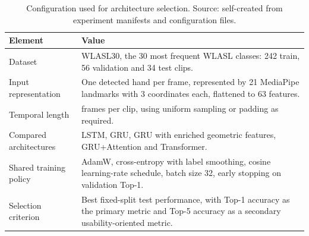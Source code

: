 \begin{table}[H]
    \centering
    \small
    \renewcommand{\arraystretch}{1.25}
    \caption{Configuration used for architecture selection. Source: self-created from experiment manifests and configuration files.}
    \label{tab:exp_phase2_config}
    \begin{tabularx}{\linewidth}{@{}>{\RaggedRight\arraybackslash}p{3.2cm} >{\RaggedRight\arraybackslash}X@{}}
        \toprule
        \textbf{Element}       & \textbf{Value}                                                                                                                            \\
        \midrule
        Dataset                & WLASL30, the 30 most frequent WLASL classes: 242 train, 56 validation and 34 test clips.                                                  \\
        Input representation   & One detected hand per frame, represented by 21 MediaPipe landmarks with 3 coordinates each, flattened to 63 features.                     \\
        Temporal length        & 64 frames per clip, using uniform sampling or padding as required.                                                                        \\
        Compared architectures & LSTM, GRU, GRU with enriched geometric features, GRU+Attention and Transformer.                                                           \\
        Shared training policy & AdamW, cross-entropy with label smoothing, cosine learning-rate schedule, batch size 32, early stopping on validation Top-1.              \\
        Selection criterion    & Best fixed-split test performance, with Top-1 accuracy as the primary metric and Top-5 accuracy as a secondary usability-oriented metric. \\
        \bottomrule
    \end{tabularx}
\end{table}

